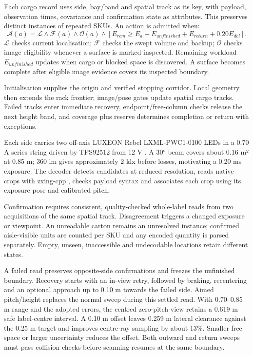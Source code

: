 \documentclass[a4paper,11pt]{article}
\begin{document}
Each cargo record uses side, bay/band and spatial track as its key, with payload, observation times, covariance and confirmation state as attributes. This preserves distinct instances of repeated SKUs. An action is admitted when:
\begin{equation}\mathcal A(a)=\mathcal L\land\mathcal F(a)\land\mathcal O(a)\land\left[E_{rem}\ge E_a+E_{unfinished}+E_{return}+0.20E_{del}\right].\end{equation}
$\mathcal L$ checks current localisation; $\mathcal F$ checks the swept volume and backup; $\mathcal O$ checks image eligibility whenever a surface is marked inspected. Remaining workload $E_{unfinished}$ updates when cargo or blocked space is discovered. A surface becomes complete after eligible image evidence covers its inspected boundary.

Initialisation supplies the origin and verified stopping corridor. Local geometry then extends the rack frontier; image/pose gates update spatial cargo tracks. Failed tracks enter immediate recovery, endpoint/free-column checks release the next height band, and coverage plus reserve determines completion or return with exceptions.

Each side carries two off-axis LUXEON Rebel LXML-PWC1-0100 LEDs in a 0.70 A series string driven by TPS92512 from 12 V \cite{r34}. A 30° beam covers about 0.16 m² at 0.85 m; 360 lm gives approximately 2 klx before losses, motivating a 0.20 ms exposure. The decoder detects candidates at reduced resolution, reads native crops with zxing-cpp \cite{r26}, checks payload syntax and associates each crop using its exposure pose and calibrated pitch.

Confirmation requires consistent, quality-checked whole-label reads from two acquisitions of the same spatial track. Disagreement triggers a changed exposure or viewpoint. An unreadable carton remains an unresolved instance; confirmed aisle-visible units are counted per SKU and any encoded quantity is parsed separately. Empty, unseen, inaccessible and undecodable locations retain different states.

A failed read preserves opposite-side confirmations and freezes the unfinished boundary. Recovery starts with an in-view retry, followed by braking, recentering and an optional approach up to 0.10 m towards the failed side. Aimed pitch/height replaces the normal sweep during this settled read. With 0.70–0.85 m range and the adopted errors, the centred zero-pitch view retains a 0.619 m safe label-centre interval. A 0.10 m offset leaves 0.259 m lateral clearance against the 0.25 m target and improves centre-ray sampling by about 13\%. Smaller free space or larger uncertainty reduces the offset. Both outward and return sweeps must pass collision checks before scanning resumes at the same boundary.
\end{document}
